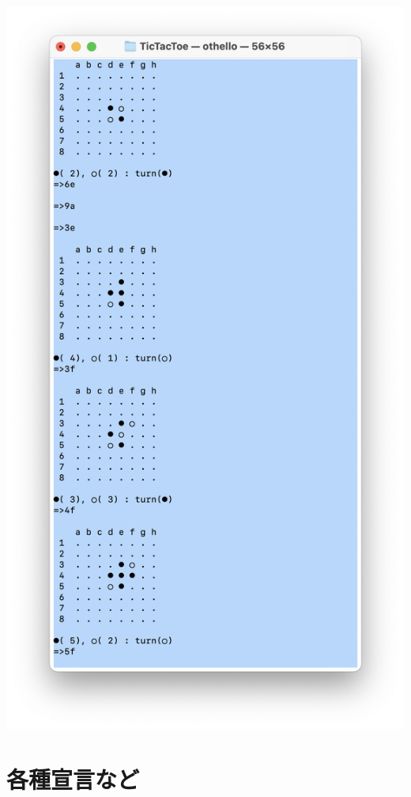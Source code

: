 \documentclass[uplatex,a4paper,11pt,oneside,openany]{jsbook}
\begin{document}
\includegraphics[keepaspectratio,scale=0.5]{othelloview.png}

\newpage

\section{各種宣言など}
\end{document}
